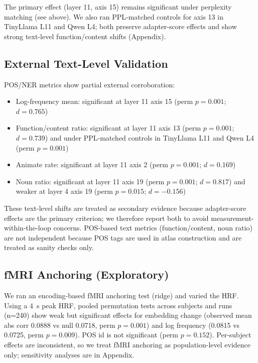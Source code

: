 \documentclass[
]{article}
\begin{document}
The primary effect (layer 11, axis 15) remains significant under
perplexity matching (see above). We also ran PPL-matched controls for
axis 13 in TinyLlama L11 and Qwen L4; both preserve adapter-score
effects and show strong text-level function/content shifts (Appendix).

\subsection{External Text-Level
Validation}\label{external-text-level-validation}

POS/NER metrics show partial external corroboration:

\begin{itemize}
\item
  Log-frequency mean: significant at layer 11 axis 15 (perm \(p=0.001\);
  \(d=0.765\))
\item
  Function/content ratio: significant at layer 11 axis 13 (perm
  \(p=0.001\); \(d=0.739\)) and under PPL-matched controls in TinyLlama
  L11 and Qwen L4 (perm \(p=0.001\))
\item
  Animate rate: significant at layer 11 axis 2 (perm \(p=0.001\);
  \(d=0.169\))
\item
  Noun ratio: significant at layer 11 axis 19 (perm \(p=0.001\);
  \(d=0.817\)) and weaker at layer 4 axis 19 (perm \(p=0.015\);
  \(d=-0.156\))
\end{itemize}

These text-level shifts are treated as secondary evidence because
adapter-score effects are the primary criterion; we therefore report
both to avoid measurement-within-the-loop concerns. POS-based text
metrics (function/content, noun ratio) are not independent because POS
tags are used in atlas construction and are treated as sanity checks
only.

\subsection{fMRI Anchoring
(Exploratory)}\label{fmri-anchoring-exploratory}

We ran an encoding-based fMRI anchoring test (ridge) and varied the HRF.
Using a 4~s peak HRF, pooled permutation tests across subjects and runs
(n=240) show weak but significant effects for embedding change (observed
mean abs corr 0.0888 vs null 0.0718, perm \(p=0.001\)) and log frequency
(0.0815 vs 0.0725, perm \(p=0.009\)). POS id is not significant (perm
\(p=0.152\)). Per-subject effects are inconsistent, so we treat fMRI
anchoring as population-level evidence only; sensitivity analyses are in
Appendix.
\end{document}
